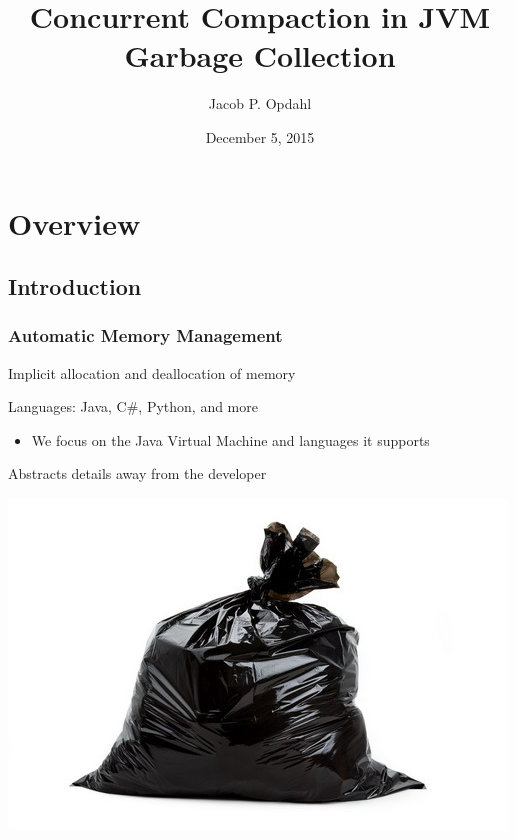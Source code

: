 \documentclass{beamer}
\title[Concurrent Compaction in JVM GC]{Concurrent Compaction in JVM Garbage Collection}
\author[Jacob Opdahl]{Jacob P. Opdahl}
\institute[UMM]
{
  University of Minnesota, Morris \\[\baselineskip]
  \emph{opdah023@morris.umn.edu}
}
\date[December 5, 2015] %
{December 5, 2015}
\newcommand{\linespace}{\vskip 0.25cm}
\begin{document}
\begin{frame}
  \titlepage
\end{frame}




\section*{Overview}

\subsection*{Introduction}

\begin{frame}

\frametitle{Automatic Memory Management}

Implicit allocation and deallocation of memory

\linespace
\linespace

Languages: Java, C\#, Python, and more
\begin{itemize}
\item We focus on the Java Virtual Machine and languages it supports
\end{itemize}

\linespace
\linespace

Abstracts details away from the developer

\linespace

\begin{center}
\includegraphics[width=.3\textwidth]{Illustrations/garbage.jpg}
\end{center}

\end{frame}
\end{document}
